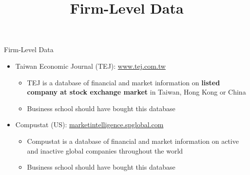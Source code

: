 \documentclass[hyperref={pdfpagelabels=false}]{beamer}
\begin{document}
\title[]  
{Firm-Level Data}


\author 
{}

\institute{}






\date
{}


\begin{frame}{}
	\titlepage
\end{frame}





\begin{frame}{Firm-Level Data}
\begin{itemize} 
\item Taiwan Economic Journal (TEJ): \href{https://www.tej.com.tw/webtej/doc/index.htm}{www.tej.com.tw}  
\vspace{0.3cm}
\begin{itemize}
\item TEJ is a database of financial and market information on  \textbf{listed company at stock exchange market} in Taiwan, Hong Kong or China	
\vspace{0.3cm}
\item Business school should have bought this database
\end{itemize}
\vspace{0.3cm}
\item Compustat (US): \href{https://marketintelligence.spglobal.com/client-solutions/}{marketintelligence.spglobal.com}
\begin{itemize}
	\vspace{0.3cm}
\item Compustat is a database of financial and market information on active and inactive global companies throughout the world	
\vspace{0.3cm}
\item Business school should have bought this database
\end{itemize}


\end{itemize}
\end{frame}
\end{document}
